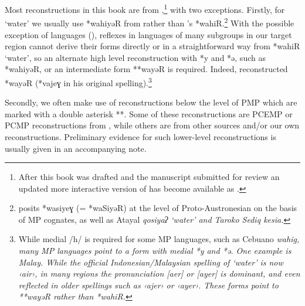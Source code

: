 Most reconstructions in this book are from \citet{BlustTrussel2020},\footnote{
		After this book was drafted
		and the manuscript submitted for review
		an updated more interactive version of
		\citet{BlustTrussel2020} has become
		available as \citet{BlustSmith2023}.}
with two exceptions.
Firstly, for ‘water’ we usually use *wahiyəR from \citet[1027]{Wolff2010}
rather than \citeauthor{BlustTrussel2020}'s *wahiR.\footnote{
		\citet[1027]{Wolff2010} posits
		*wasiyeɣ (= *waSiyəR) at the level of
		Proto-Austronesian on the basis of MP cognates,
		as well as Atayal \it{qosiyaʔ} ‘water’
		and Taroko Sediq \it{kesia}.}
With the possible exception of  languages (),
reflexes in languages of many subgroups in our target region
cannot derive their forms directly or in a straightforward way from *wahiR ‘water’,
so an alternate high level reconstruction with *y
and *ə, such as \citeauthor{Wolff2010} *wahiyəR,
or an intermediate form **wayəR is required.
Indeed, \citet[167]{Dempwolff1938} reconstructed *wayəR
(*vajeɣ in his original spelling).\footnote{
		While medial /h/ is required for some MP languages,
		such as Cebuano \it{wahig},
		many MP languages point to a form with medial *y and *ə.
		One example is Malay.
		While the official Indonesian/Malaysian spelling of ‘water’ is now ‹air›,
		in many regions the pronunciation [aer] or [ayer] is dominant,
		and even reflected in older spellings such as ‹ajer› or ‹ayer›.
		These forms point to **wayəR rather than *wahiR.}

Secondly, we often make use of reconstructions below the
level of PMP which are marked with a double asterisk **.
Some of these reconstructions are PCEMP or PCMP
reconstructions from \citet{BlustTrussel2020},
while others are from other sources
and/or our own reconstructions.
Preliminary evidence for such lower-level reconstructions
is usually given in an accompanying note.
